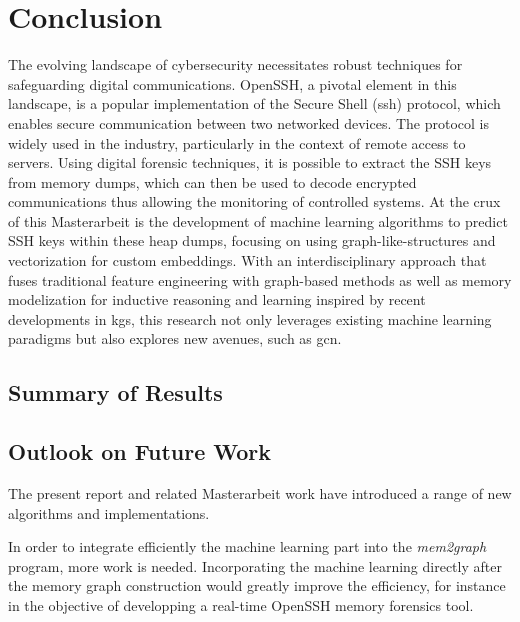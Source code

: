 \chapter{Conclusion}\label{chap:conclusion}


The evolving landscape of cybersecurity necessitates robust techniques for safeguarding digital communications. OpenSSH, a pivotal element in this landscape, is a popular implementation of the Secure Shell (\acrshort{ssh}) protocol, which enables secure communication between two networked devices. The protocol is widely used in the industry, particularly in the context of remote access to servers. Using digital forensic techniques, it is possible to extract the SSH keys from memory dumps, which can then be used to decode encrypted communications thus allowing the monitoring of controlled systems. At the crux of this Masterarbeit is the development of machine learning algorithms to predict SSH keys within these heap dumps, focusing on using graph-like-structures and vectorization for custom embeddings. With an interdisciplinary approach that fuses traditional feature engineering with graph-based methods as well as memory modelization for inductive reasoning and learning inspired by recent developments in \acrfull{kg}s, this research not only leverages existing machine learning paradigms but also explores new avenues, such as \acrfull{gcn}.

\section{Summary of Results}

\section{Outlook on Future Work}\label{conclusion:sec:future_work}


The present report and related Masterarbeit work have introduced a range of new algorithms and implementations. 

In order to integrate efficiently the machine learning part into the \textit{mem2graph} program, more work is needed. Incorporating the machine learning directly after the memory graph construction would greatly improve the efficiency, for instance in the objective of developping a real-time OpenSSH memory forensics tool.

